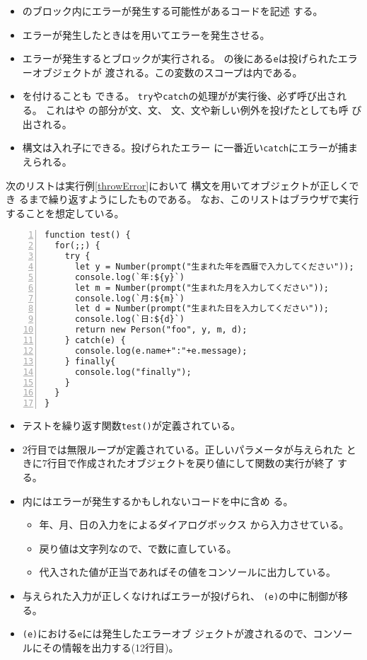 \begin{itemize}
 \item {}のブロック内にエラーが発生する可能性があるコードを記述
       する。
 \item エラーが発生したときはを用いてエラーを発生させる。
 \item エラーが発生するとブロックが実行される。
       の後にある\texttt{e}は投げられたエラーオブジェクトが
       渡される。この変数のスコープは内である。
 \item {}を付けることも
       できる。%
       \texttt{try}や\texttt{catch}の処理がが実行後、必ず呼び出される。
       これはや
       の部分が文、文、
       文、文や新しい例外を投げたとしても呼
       び出される。
 \item {}構文は入れ子にできる。投げられたエラー
			 に一番近い\texttt{catch}にエラーが捕まえられる。
\end{itemize}
 \begin{Exec}\upshape
	次のリストは実行例\ref{throwError}において
  構文を用いてオブジェクトが正しくでき
	るまで繰り返すようにしたものである。
 なお、このリストはブラウザで実行することを想定している。
 \end{Exec}
\begin{Verbatim}[numbers=left]
function test() {
  for(;;) {
    try {
      let y = Number(prompt("生まれた年を西暦で入力してください"));
      console.log(`年:${y}`)
      let m = Number(prompt("生まれた月を入力してください"));
      console.log(`月:${m}`)
      let d = Number(prompt("生まれた日を入力してください"));
      console.log(`日:${d}`)
      return new Person("foo", y, m, d);
    } catch(e) {
      console.log(e.name+":"+e.message);
    } finally{
      console.log("finally");
    }
  }
}
\end{Verbatim}
\begin{itemize}
 \item テストを繰り返す関数\texttt{test()}が定義されている。
 \item 2行目では無限ループが定義されている。正しいパラメータが与えられた
			 ときに7行目で作成されたオブジェクトを戻り値にして関数の実行が終了
			 する。
 \item {}内にはエラーが発生するかもしれないコードを中に含め
			 る。
	\begin{itemize}
	 \item 年、月、日の入力をによるダイアログボックス
				 から入力させている。
	 \item 戻り値は文字列なので、で数に直している。
   \item 代入された値が正当であればその値をコンソールに出力している。
	\end{itemize}
 \item 与えられた入力が正しくなければエラーが投げられ、
			 \texttt{(e)}の中に制御が移る。
 \item {}\texttt{(e)}における\texttt{e}には発生したエラーオブ
			 ジェクトが渡されるので、コンソールにその情報を出力する(12行目)。
\end{itemize}
